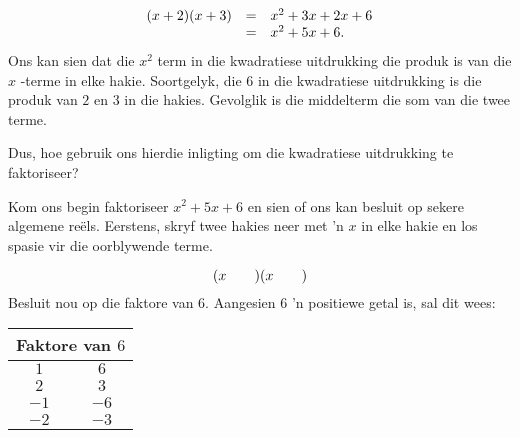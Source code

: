 \begin{equation*}
\begin{array}{ccl}\hfill (x+2)(x+3)& =& x^2+3x+2x+6 \\ & =& {x}^{2}+5x+6.\hfill \end{array}
\end{equation*}
Ons kan sien dat die ${x}^{2}$ term in die kwadratiese uitdrukking die produk is van die $x$ -terme in elke hakie. Soortgelyk, die $6$ in die kwadratiese uitdrukking is die produk van $2$ en $3$ in die hakies. Gevolglik is die middelterm die
som van die twee terme.\par 
Dus, hoe gebruik ons hierdie inligting om die kwadratiese uitdrukking te faktoriseer?\par 
Kom ons begin faktoriseer ${x}^{2}+5x+6$ en sien of ons kan besluit op sekere algemene reëls. Eerstens, skryf twee hakies neer met ’n $x$ in elke hakie en los spasie vir die oorblywende terme.\par 
\begin{equation*}
(x\phantom{\rule{2.em}{0ex}})(x\phantom{\rule{2.em}{0ex}})
\end{equation*}
Besluit nou op die faktore van $6$. Aangesien $6$ ’n positiewe getal is, sal dit wees:\par 
\begin{table}[H]
\begin{center}
\noindent

\begin{tabular}[t]{|c|c|}\hline
\multicolumn{2}{|c|}{\textbf{Faktore van $6$}}
\\ \hline
$1$ &
$6$%
\\ \hline
$2$ &
$3$%
\\ \hline
$-1$ &
$-6$%
\\ \hline
$-2$ &
$-3$%
\\ \hline
\end{tabular}
\end{center}
\end{table}
